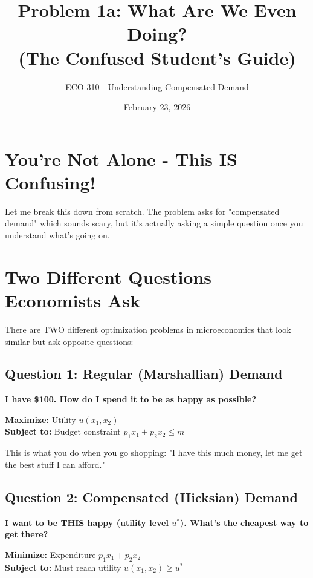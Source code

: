 \documentclass[11pt]{article}
\title{Problem 1a: What Are We Even Doing? \\ (The Confused Student's Guide)}
\author{ECO 310 - Understanding Compensated Demand}
\date{February 23, 2026}
\begin{document}
\maketitle

\section{You're Not Alone - This IS Confusing!}

Let me break this down from scratch. The problem asks for "compensated demand" which sounds scary, but it's actually asking a simple question once you understand what's going on.

\section{Two Different Questions Economists Ask}

There are TWO different optimization problems in microeconomics that look similar but ask opposite questions:

\subsection{Question 1: Regular (Marshallian) Demand}

\begin{tcolorbox}[colback=blue!5!white,colframe=blue!75!black,title=The Normal Question]
\textbf{I have \$100. How do I spend it to be as happy as possible?}

\textbf{Maximize:} Utility $u(x_1, x_2)$ \\
\textbf{Subject to:} Budget constraint $p_1 x_1 + p_2 x_2 \leq m$
\end{tcolorbox}

This is what you do when you go shopping: "I have this much money, let me get the best stuff I can afford."

\subsection{Question 2: Compensated (Hicksian) Demand}

\begin{tcolorbox}[colback=green!5!white,colframe=green!75!black,title=The Backwards Question]
\textbf{I want to be THIS happy (utility level $u^*$). What's the cheapest way to get there?}

\textbf{Minimize:} Expenditure $p_1 x_1 + p_2 x_2$ \\
\textbf{Subject to:} Must reach utility $u(x_1, x_2) \geq u^*$
\end{tcolorbox}
\end{document}
